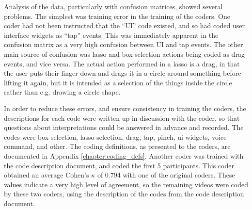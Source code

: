 Analysis of the data, particularly with confusion matrices, showed several problems. 
The simplest was training error in the training of the coders.
One coder had not been instructed that the ``UI'' code existed, and so had coded user interface widgets as ``tap'' events.   
This was immediately apparent in the confusion matrix as a very high confusion between UI and tap events. 
The other main source of confusion was lasso and box selection actions being coded as drag events, and vice versa.
The actual action performed in a lasso is a drag, in that the user puts their finger down and drags it in a circle around something before lifting it again, but it is intended as a selection of the things inside the circle rather than e.g. drawing a circle shape. 

In order to reduce these errors, and ensure consistency in training the coders, the descriptions for each code were written up in discussion with the coder, so that questions about interpretations could be answered in advance and recorded. 
The codes were box selection, lasso selection, drag, tap, pinch, ui widgets, voice command, and other. 
The coding definitions, as presented to the coders, are documented in Appendix \ref{chapter:coding_defs}.
Another coder was trained with the code description document, and coded the first 5 participants. 
This coder obtained an average Cohen's $\kappa$ of 0.794 with one of the original coders.
These values indicate a very high level of agreement, so the remaining videos were coded by these two coders, using the description of the codes from the code description document.  

